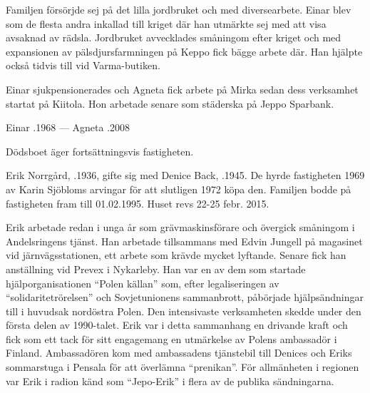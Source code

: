 Familjen försörjde sej på det lilla jordbruket och med diversearbete. Einar blev som de flesta andra inkallad till kriget där han utmärkte sej med att visa avsaknad av rädsla. Jordbruket avvecklades småningom efter kriget och med expansionen av pälsdjursfarmningen på Keppo fick bägge arbete där. Han hjälpte också tidvis till vid Varma-butiken.

Einar sjukpensionerades och Agneta fick arbete på Mirka sedan dess verksamhet startat på Kiitola. Hon arbetade senare som städerska på Jeppo Sparbank.
\begin{jhchildren}
  \item {}
  \item {}
  \item {}
  \item {}
\end{jhchildren}

Einar .1968  ---  Agneta .2008

Dödsboet äger fortsättningsvis fastigheten.





Erik Norrgård, .1936, gifte sig med Denice Back, .1945. De hyrde fastigheten 1969 av Karin Sjöbloms arvingar för att slutligen 1972 köpa den. Familjen bodde på fastigheten fram till 01.02.1995. Huset revs 22-25 febr. 2015.

Erik arbetade redan i unga år som grävmaskinsförare och övergick småningom i Andelsringens tjänst. Han arbetade tillsammans med Edvin Jungell på magasinet vid järnvägsstationen, ett arbete som krävde mycket lyftande.  Senare fick han anställning vid Prevex i Nykarleby. Han var en av dem som startade hjälporganisationen ``Polen källan'' som, efter legaliseringen av ``solidaritetrörelsen'' och Sovjetunionens sammanbrott, påbörjade hjälpsändningar till i huvudsak nordöstra Polen. Den intensivaste verksamheten skedde under den första delen av 1990-talet. Erik var i detta sammanhang en drivande kraft och fick som ett tack för sitt engagemang en utmärkelse av Polens ambassadör i Finland. Ambassadören kom med ambassadens tjänstebil till Denices och Eriks sommarstuga i Pensala för att överlämna ``prenikan''. För allmänheten i regionen var Erik i radion känd som ``Jepo-Erik'' i flera av de publika sändningarna.


